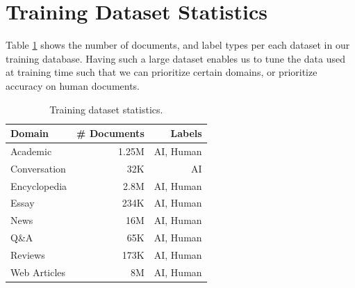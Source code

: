 \documentclass[11pt]{article}
\begin{document}



%

\newpage
\appendix

\section{Training Dataset Statistics}
\label{sec:training_data_stats}
Table \ref{table:training_data_stats} shows the number of documents, and label types per each dataset in our training database. Having such a large dataset enables us to tune the data used at training time such that we can prioritize certain domains, or prioritize accuracy on human documents.
\begin{table}
    \centering
    \begin{tabular}{lrr}
    \toprule
         Domain & \# Documents &  Labels \\
    \midrule
       Academic & 1.25M & AI, Human \\
       Conversation & 32K & AI \\
       Encyclopedia & 2.8M & AI, Human \\
       Essay & 234K & AI, Human \\
       News & 16M & AI, Human \\
       Q\&A & 65K & AI, Human \\
       Reviews & 173K & AI, Human \\
       Web Articles & 8M & AI, Human \\
    \bottomrule
    \end{tabular}
    \caption{Training dataset statistics.}
    \label{table:training_data_stats}
\end{table}
\end{document}
